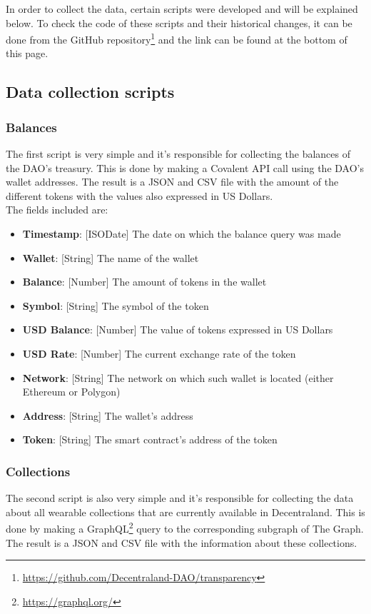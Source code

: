 \documentclass[MSE,Master,english]{twbook}%
\begin{document}
In order to collect the data, certain scripts were developed and will be explained below. To check the code of these scripts and their historical changes, it can be done from the GitHub repository\footnote{\url{https://github.com/Decentraland-DAO/transparency}} and the link can be found at the bottom of this page.

\subsection{Data collection scripts}
\subsubsection{Balances}
The first script is very simple and it's responsible for collecting the balances of the DAO's treasury. This is done by making a Covalent API call using the DAO's wallet addresses. The result is a JSON and CSV file with the amount of the different tokens with the values also expressed in US Dollars. \\

The fields included are:
\begin{itemize}
  \item \textbf{Timestamp}: [ISODate] The date on which the balance query was made
  \item \textbf{Wallet}: [String] The name of the wallet
  \item \textbf{Balance}: [Number] The amount of tokens in the wallet
  \item \textbf{Symbol}: [String] The symbol of the token
  \item \textbf{USD Balance}: [Number] The value of tokens expressed in US Dollars
  \item \textbf{USD Rate}: [Number] The current exchange rate of the token
  \item \textbf{Network}: [String] The network on which such wallet is located (either Ethereum or Polygon)
  \item \textbf{Address}: [String] The wallet's address
  \item \textbf{Token}: [String] The smart contract's address of the token
\end{itemize}

\subsubsection{Collections}
The second script is also very simple and it's responsible for collecting the data about all wearable collections that are currently available in Decentraland. This is done by making a GraphQL\footnote{\url{https://graphql.org/}} query to the corresponding subgraph of The Graph. The result is a JSON and CSV file with the information about these collections. \\
\end{document}
